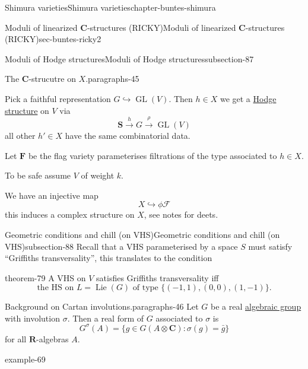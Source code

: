 \documentclass[oneside,10pt,]{book}
\numberwithin{equation}{section}
\newcommand{\Lie}{\operatorname{Lie}}
\newcommand{\RR}{\mathbf{R}}
\newcommand{\CC}{\mathbf{C}}
\DeclareMathOperator{\GL}{GL}
\begin{document}
\begin{chapterptx}{Shimura varieties}{}{Shimura varieties}{}{}{chapter-buntes-shimura}
\begin{sectionptx}{Moduli of linearized \(\CC\)-structures (RICKY)}{}{Moduli of linearized \(\CC\)-structures (RICKY)}{}{}{sec-buntes-ricky2}
\begin{subsectionptx}{Moduli of Hodge structures}{}{Moduli of Hodge structures}{}{}{subsection-87}
\begin{paragraphs}{The \(\CC\)-strucutre on \(X\).}{paragraphs-45}
\par
\hypertarget{p-1195}{}%
Pick a faithful representation \(G \hookrightarrow \GL(V)\). Then \(h \in X\) we get a \hyperref[def-hodge-str]{Hodge structure} on \(V\) via%
\begin{equation*}
\mathbf S \xrightarrow h G \xrightarrow \rho \GL(V)
\end{equation*}
all other \(h' \in X\) have the same combinatorial data.%
\par
\hypertarget{p-1196}{}%
Let \(\mathbf F\) be the flag variety parameterises filtrations of the type associated to \(h \in X\).%
\par
\hypertarget{p-1197}{}%
To be safe assume \(V\) of weight \(k\).%
\par
\hypertarget{p-1198}{}%
We have an injective map%
\begin{equation*}
X \hookrightarrow \phi \mathcal F
\end{equation*}
this induces a complex structure on \(X\), see notes for deets.%
\end{paragraphs}%
\end{subsectionptx}
%
%
\typeout{************************************************}
\typeout{************************************************}
%
\begin{subsectionptx}{Geometric conditions and chill (on VHS)}{}{Geometric conditions and chill (on VHS)}{}{}{subsection-88}
\hypertarget{p-1199}{}%
Recall that a VHS parameterised by a space \(S\) must satisfy ``Griffiths transversality'', this translates to the condition%
\begin{theorem}{}{}{theorem-79}%
\hypertarget{p-1200}{}%
A VHS on \(V\) satisfies Griffiths transversality iff%
\begin{equation}
\text{the HS  on } L = \Lie(G) \text{ of type }\{(-1,1),(0,0),(1,-1)\}\text{.}\label{men-2}
\end{equation}
%
\end{theorem}
\begin{paragraphs}{Background on Cartan involutions.}{paragraphs-46}%
\hypertarget{p-1201}{}%
Let \(G\) be a real \hyperref[def-alg-gp]{algebraic group} with involution \(\sigma\). Then a real form of \(G\)  associated to \(\sigma\) is%
\begin{equation*}
G^\sigma (A) = \{ g \in G(A \otimes \CC) : \sigma(g) = \bar g\}
\end{equation*}
for all \(\RR\)-algebras \(A\).%
\begin{example}{}{example-69}%

\end{example}
\end{paragraphs}
\end{subsectionptx}
\end{sectionptx}
\end{chapterptx}
\end{document}
